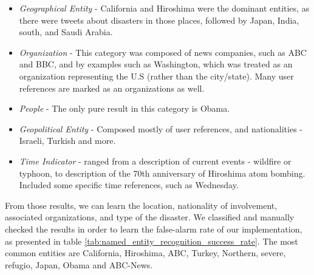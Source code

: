 \documentclass[letterpaper,twocolumn,10pt]{article}
\begin{document}
\begin{itemize}[noitemsep, nolistsep]
	\item \textit{Geographical Entity} - California and Hiroshima were the dominant entities, as there were tweets about disasters in those places, followed by Japan, India, south, and Saudi Arabia.
	\item \textit{Organization} - This category was composed of news companies, such as ABC and BBC, and by examples such as Washington, which was treated as an organization representing the U.S (rather than the city/state). Many user references are marked as an organizations as well.
	\item \textit{People} - The only pure result in this category is Obama.
	\item \textit{Geopolitical Entity} - Composed mostly of user references, and nationalities - Israeli, Turkish and more.
	\item \textit{Time Indicator} - ranged from a description of current events - wildfire or typhoon, to description of the 70th anniversary of Hiroshima atom bombing. Included some specific time references, such as Wednesday.
\end{itemize}

From those results, we can learn the location, nationality of involvement, associated organizations, and type of the disaster. We classified and manually checked the results in order to learn the false-alarm rate of our implementation, as presented in table 
 \ref{tab:named_entity_recognition_success_rate}. The most common entities are California, Hiroshima, ABC, Turkey, Northern, severe, refugio, Japan, Obama and ABC-News.

\begin{table}[H]
	\begin{center}
	\end{center}
	\caption{Named Entity Recognition Success Rate}
	\label{tab:named_entity_recognition_success_rate}
\end{table}


\end{document}
